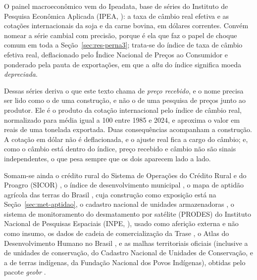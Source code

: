O painel macroeconômico vem do Ipeadata, base de séries do Instituto de
Pesquisa Econômica Aplicada (IPEA, \citeyear{IPEA_Ipeadata}): a taxa de câmbio
real efetiva e as cotações internacionais da soja e da carne bovina, em dólares
correntes. Convém
nomear a série cambial com precisão, porque é ela que faz o papel de choque
comum em toda a Seção~\ref{sec:res-perna3}; trata-se do índice de taxa de
câmbio efetiva real, deflacionado pelo Índice Nacional de Preços ao Consumidor
e ponderado pela pauta de exportações, em que a \emph{alta} do índice significa
moeda \emph{depreciada}.

Dessas séries deriva o que este texto chama de \emph{preço recebido}, e o nome
precisa ser lido como o de uma construção, e não o de uma pesquisa de preços
junto ao produtor. Ele é o produto da cotação internacional pelo índice de
câmbio real, normalizado para média igual a 100 entre 1985 e 2024, e aproxima o
valor em reais de uma tonelada exportada. Duas consequências acompanham a
construção. A cotação em dólar não é deflacionada, e o ajuste real fica a cargo
do câmbio; e, como o câmbio está dentro do índice, preço recebido e câmbio não
são sinais independentes, o que pesa sempre que os dois aparecem lado a lado.

Somam-se ainda o crédito rural do Sistema de Operações do Crédito Rural e do
Proagro (SICOR) \cite{BACEN_SICOR}, o índice de desenvolvimento municipal
\cite{FIRJAN_IFDM}, o mapa de aptidão agrícola das terras do Brasil
\cite{Embrapa_Aptidao}, cuja construção como exposição está na
Seção~\ref{sec:met-aptidao}, o cadastro nacional de unidades armazenadoras
\cite{CONAB_Armazenagem}, o sistema de monitoramento do
desmatamento por satélite (PRODES) do Instituto Nacional de Pesquisas
Espaciais (INPE, \citeyear{INPE_PRODES}), usado como aferição externa e não como
insumo, os dados de cadeia de comercialização da Trase \cite{Trase2026}, o
Atlas do Desenvolvimento Humano no Brasil \cite{IPEA_IDHM}, e as malhas
territoriais oficiais (inclusive a de unidades de conservação, do Cadastro
Nacional de Unidades de Conservação, e a de terras indígenas, da Fundação
Nacional dos Povos Indígenas), obtidas pelo pacote \emph{geobr}
\cite{Pereira2019geobr}.

